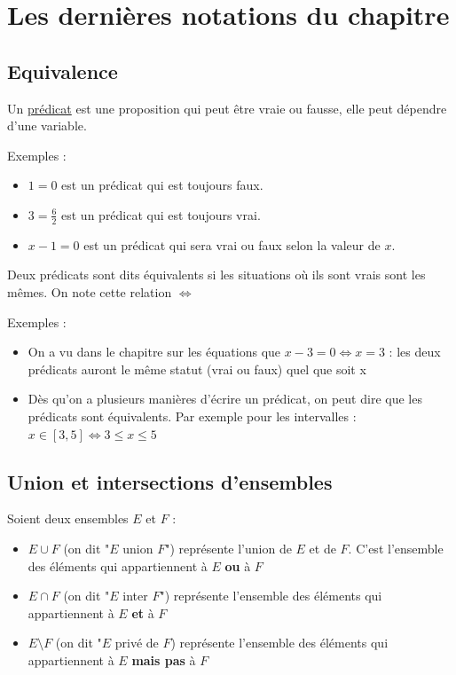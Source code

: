 \documentclass[10pt,a4paper,oneside]{book}
\begin{document}
\section{Les dernières notations du chapitre}

\subsection{Equivalence}

Un \underline{prédicat} est une proposition qui peut être vraie ou fausse, elle peut dépendre d'une variable. 

Exemples :
\begin{itemize}
    \item $1=0$ est un prédicat qui est toujours faux.
    \item $3 = \frac{6}{2}$ est un prédicat qui est toujours vrai.
    \item $x - 1 = 0$ est un prédicat qui sera vrai ou faux selon la valeur de $x$.
\end{itemize}

\begin{de}
    Deux prédicats sont dits équivalents si les situations où ils sont vrais sont les mêmes. On note cette relation $\Leftrightarrow$
\end{de}

Exemples :
\begin{itemize}
    \item On a vu dans le chapitre sur les équations que $x-3 = 0 \Leftrightarrow x = 3$ : les deux prédicats auront le même statut (vrai ou faux) quel que soit x
    \item Dès qu'on a plusieurs manières d'écrire un prédicat, on peut dire que les prédicats sont équivalents. Par exemple pour les intervalles : $x \in [3,5] \Leftrightarrow  3 \leq x \leq 5$
\end{itemize}

\subsection{Union et intersections d'ensembles}

\begin{de}
    Soient deux ensembles $E$ et $F$ :
    \begin{itemize}
        \item $E \cup F$ (on dit "$E$ union $F$") représente l'union de $E$ et de $F$. C'est l'ensemble des éléments qui appartiennent à $E$ \textbf{ou} à $F$
        \item $E \cap F$ (on dit "$E$ inter $F$") représente l'ensemble des éléments qui appartiennent à $E$ \textbf{et} à $F$
        \item $E \setminus F$ (on dit "$E$ privé de $F$) représente l'ensemble des éléments qui appartiennent à $E$ \textbf{mais pas} à $F$
    \end{itemize}
\end{de}
\end{document}
